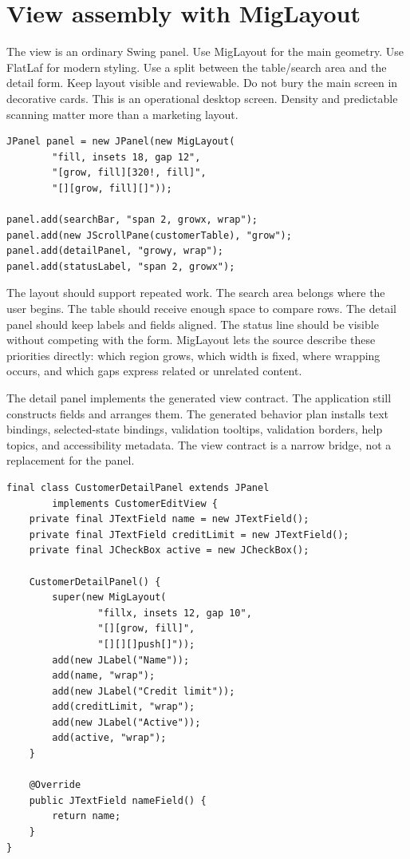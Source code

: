 \section{View assembly with MigLayout}

The view is an ordinary Swing panel. Use MigLayout for the main geometry. Use
FlatLaf for modern styling. Use a split between the table/search area and the
detail form. Keep layout visible and reviewable. Do not bury the main screen
in decorative cards. This is an operational desktop screen. Density and
predictable scanning matter more than a marketing layout.

\begin{lstlisting}[caption={Workspace layout shape.}]
JPanel panel = new JPanel(new MigLayout(
        "fill, insets 18, gap 12",
        "[grow, fill][320!, fill]",
        "[][grow, fill][]"));

panel.add(searchBar, "span 2, growx, wrap");
panel.add(new JScrollPane(customerTable), "grow");
panel.add(detailPanel, "growy, wrap");
panel.add(statusLabel, "span 2, growx");
\end{lstlisting}

The layout should support repeated work. The search area belongs where the
user begins. The table should receive enough space to compare rows. The detail
panel should keep labels and fields aligned. The status line should be visible
without competing with the form. MigLayout lets the source describe these
priorities directly: which region grows, which width is fixed, where wrapping
occurs, and which gaps express related or unrelated content.

The detail panel implements the generated view contract. The application still
constructs fields and arranges them. The generated behavior plan installs text
bindings, selected-state bindings, validation tooltips, validation borders,
help topics, and accessibility metadata. The view contract is a narrow bridge,
not a replacement for the panel.

\begin{lstlisting}[caption={A handwritten panel implements a generated view contract.}]
final class CustomerDetailPanel extends JPanel
        implements CustomerEditView {
    private final JTextField name = new JTextField();
    private final JTextField creditLimit = new JTextField();
    private final JCheckBox active = new JCheckBox();

    CustomerDetailPanel() {
        super(new MigLayout(
                "fillx, insets 12, gap 10",
                "[][grow, fill]",
                "[][][]push[]"));
        add(new JLabel("Name"));
        add(name, "wrap");
        add(new JLabel("Credit limit"));
        add(creditLimit, "wrap");
        add(new JLabel("Active"));
        add(active, "wrap");
    }

    @Override
    public JTextField nameField() {
        return name;
    }
}
\end{lstlisting}

